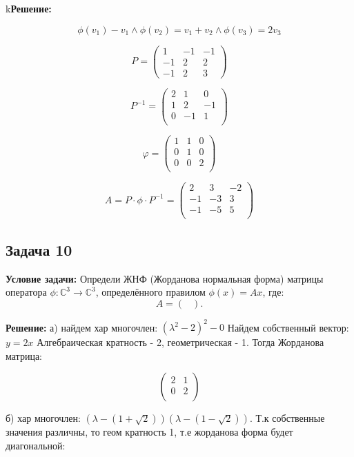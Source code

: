 \documentclass[a4paper,12pt]{article}
\begin{document}
k\textbf{Решение: }

\[
\phi(v_1) - v_1 \land \phi(v_2) = v_1 + v_2 \land \phi(v_3) = 2v_3
\]

\[
P = \begin{pmatrix}
    1 & -1 & -1 \\
    -1 & 2 & 2 \\
    -1 & 2 & 3 
\end{pmatrix}
\]

\[
P^{-1} = \begin{pmatrix}
    2 & 1 & 0 \\
1 & 2 & -1 \\
0 & -1 & 1 \\
\end{pmatrix}
\]

\[
\varphi = \begin{pmatrix}
    1 & 1 & 0 \\
    0 & 1 & 0 \\
    0 & 0 & 2 \\
\end{pmatrix}
\]

\[
A = P\cdot \phi \cdot P^{-1} = \begin{pmatrix}
    2 & 3 & -2 \\
    -1 & -3 & 3 \\
    -1 & -5 & 5 \\
\end{pmatrix}
\]

\subsection{Задача 10}
\textbf{Условие задачи:} Определи ЖНФ (Жорданова нормальная форма) матрицы оператора $\phi: \mathbb{C}^3 \to \mathbb{C}^3$, определённого правилом $\phi(x) = Ax$, где:
\[
A =
\begin{pmatrix}
\end{pmatrix}.
\]

\textbf{Решение: }
а) найдем хар многочлен: $(\lambda^2-2)^2-0$ Найдем собственный вектор: $y=2x$ Алгебраическая кратность - 2, геометрическая - 1. Тогда Жорданова матрица: 

\[
\begin{pmatrix}
    2 & 1 \\
    0 & 2 \\
\end{pmatrix}
\]

б) хар многочлен: $(\lambda-(1+\sqrt{2}))(\lambda-(1-\sqrt{2}))$. Т.к собственные значения различны, то геом кратность 1, т.е жорданова форма будет диагональной: 
\end{document}
